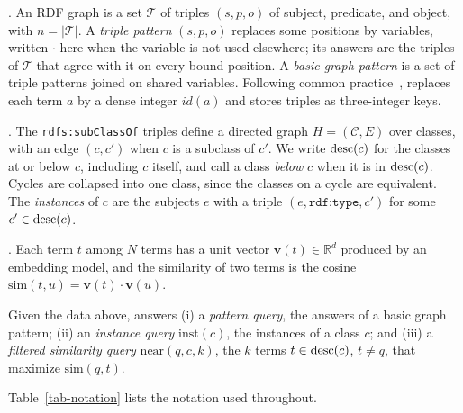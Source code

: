 .
An RDF graph is a set $\mathcal{T}$ of triples $(s,p,o)$ of subject,
predicate, and object, with $n=|\mathcal{T}|$.
A \emph{triple pattern} $(s,p,o)$ replaces some positions by variables,
written $\cdot$ here when the variable is not used elsewhere; its answers
are the triples of $\mathcal{T}$ that agree with it on every bound position.
A \emph{basic graph pattern} is a set of triple patterns joined on shared
variables.
Following common practice~\cite{weiss2008,neumann2010}, \sys replaces each
term $a$ by a dense integer $\mathit{id}(a)$ and stores triples as
three-integer keys.

.
The \texttt{rdfs:subClassOf} triples define a directed graph
$H=(\mathcal{C},E)$ over classes, with an edge $(c,c')$ when $c$ is a
subclass of $c'$.
We write $\mathrm{desc}(c)$ for the classes at or below $c$, including $c$ itself, and
call a class \emph{below} $c$ when it is in $\mathrm{desc}(c)$.
Cycles are collapsed into one class, since the classes on a cycle are
equivalent.
The \emph{instances} of $c$ are the subjects $e$ with a triple
$(e,\texttt{rdf:type},c')$ for some $c'\in\mathrm{desc}(c)$.

.
Each term $t$ among $N$ terms has a unit vector $\mathbf{v}(t)\in\mathbb{R}^d$
produced by an embedding model, and the similarity of two terms is the cosine
$\mathrm{sim}(t,u)=\mathbf{v}(t)\cdot\mathbf{v}(u)$.

\begin{definition}[Queries]
\label{def-queries}
Given the data above, \sys answers
(i) a \emph{pattern query}, the answers of a basic graph pattern;
(ii) an \emph{instance query} $\mathrm{inst}(c)$, the instances of a class
$c$; and
(iii) a \emph{filtered similarity query} $\mathrm{near}(q,c,k)$, the $k$
terms $t\in\mathrm{desc}(c)$, $t\ne q$, that maximize $\mathrm{sim}(q,t)$.
\end{definition}

\noindent
Table~\ref{tab-notation} lists the notation used throughout.

